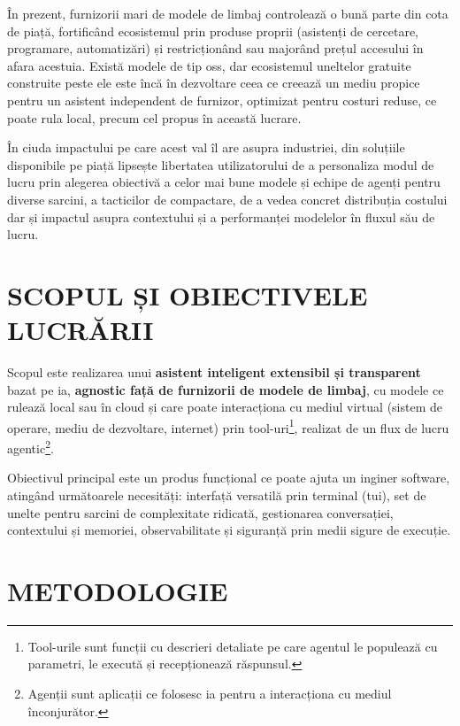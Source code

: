 \documentclass[12pt, a4paper, oneside, romanian]{teza-upb}
\begin{document}
  În prezent, furnizorii mari de modele de limbaj controlează o bună parte din cota de piață, fortificând ecosistemul prin produse proprii (asistenți de cercetare, programare, automatizări) și restricționând sau majorând prețul accesului în afara acestuia. Există modele de tip \ac{oss}, dar ecosistemul uneltelor gratuite construite peste ele este încă în dezvoltare ceea ce creează un mediu propice pentru un asistent independent de furnizor, optimizat pentru costuri reduse, ce poate rula local, precum cel propus în această lucrare.

  În ciuda impactului pe care acest val îl are asupra industriei, din soluțiile disponibile pe piață lipsește libertatea utilizatorului de a personaliza modul de lucru prin alegerea obiectivă a celor mai bune modele și echipe de agenți pentru diverse sarcini, a tacticilor de compactare, de a vedea concret distribuția costului dar și impactul asupra contextului și a performanței modelelor în fluxul său de lucru. 

\section*{SCOPUL ȘI OBIECTIVELE LUCRĂRII}

  Scopul este realizarea unui \textbf{asistent inteligent extensibil și transparent} bazat pe \ac{ia}, \textbf{agnostic față de furnizorii de modele de limbaj}, cu modele ce rulează local sau în cloud și care poate interacționa cu mediul virtual (sistem de operare, mediu de dezvoltare, internet) prin tool-uri\footnote{Tool-urile sunt funcții cu descrieri detaliate pe care agentul le populează cu parametri, le execută și recepționează răspunsul.}, realizat de un flux de lucru agentic\footnote{Agenții sunt aplicații ce folosesc \ac{ia} pentru a interacționa cu mediul înconjurător.}.

  Obiectivul principal este un produs funcțional ce poate ajuta un inginer software, atingând următoarele necesități: interfață versatilă prin terminal (\ac{tui}), set de unelte pentru sarcini de complexitate ridicată, gestionarea conversației, contextului și memoriei, observabilitate și siguranță prin medii sigure de execuție.

\newpage

\section*{METODOLOGIE}
\end{document}
